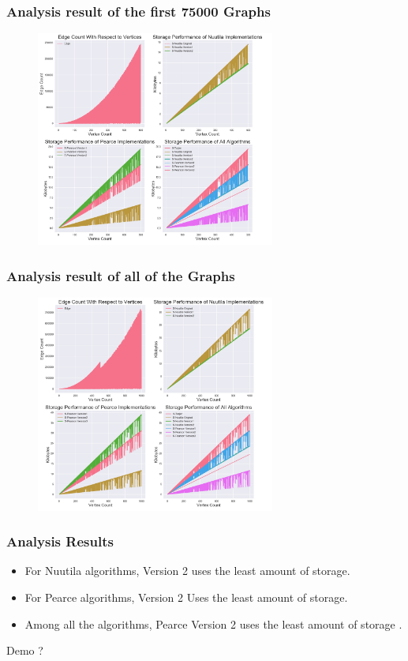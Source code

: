 \documentclass{beamer}
\begin{document}
			\begin{frame}
				\frametitle{Analysis result of the first 75000 Graphs}
					\begin{figure}[h!]
					\centering
					\includegraphics[width=0.7\textwidth]{S75000}
					\end{figure}
			\end{frame}
			\begin{frame}
				\frametitle{Analysis result of all of the Graphs}
				\begin{figure}[h!]
					\centering
					\includegraphics[width=0.7\textwidth]{SALL}
				\end{figure}
		\end{frame}
	\begin{frame}
		\frametitle{Analysis Results}
		\begin{itemize}
			\item <1-> For Nuutila algorithms, Version 2 uses the least amount of storage. 
			\item <2-> For Pearce algorithms, Version 2 Uses the least amount of storage.
			\item <3-> Among all the algorithms, Pearce Version 2 uses the least amount of storage .
		\end{itemize}
	\end{frame}
	\begin{frame}
		Demo ?
	\end{frame}
\end{document}
